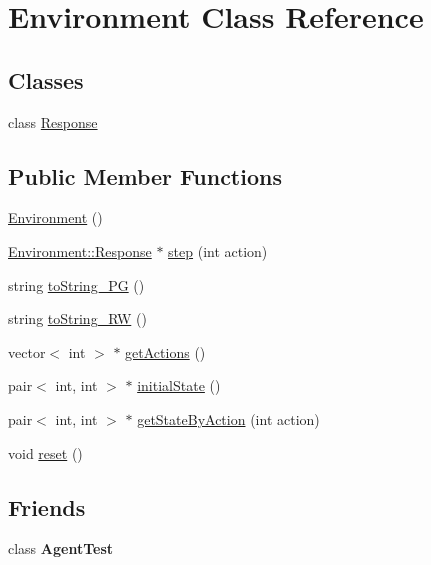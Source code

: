 \hypertarget{class_environment}{}\section{Environment Class Reference}
\label{class_environment}
\subsection*{Classes}
\begin{DoxyCompactItemize}
\item 
class \mbox{\hyperlink{class_environment_1_1_response}{Response}}
\end{DoxyCompactItemize}
\subsection*{Public Member Functions}
\begin{DoxyCompactItemize}
\item 
\mbox{\hyperlink{class_environment_a8b427c4448d8b7536666837521b9e83d}{Environment}} ()
\item 
\mbox{\hyperlink{class_environment_1_1_response}{Environment\+::\+Response}} $\ast$ \mbox{\hyperlink{class_environment_ab2531f3a79f25737da27ae5cac29ad05}{step}} (int action)
\item 
string \mbox{\hyperlink{class_environment_a7df8eab35d7ff6b7ce05eac019073ff1}{to\+String\+\_\+\+PG}} ()
\item 
string \mbox{\hyperlink{class_environment_aa542e4df56a2c6a2039fee9949052f0b}{to\+String\+\_\+\+RW}} ()
\item 
vector$<$ int $>$ $\ast$ \mbox{\hyperlink{class_environment_a98a9bfe041ae2fad721a96ee092fa45b}{get\+Actions}} ()
\item 
pair$<$ int, int $>$ $\ast$ \mbox{\hyperlink{class_environment_a7a7745adf6e9a0aec3b750e26e629f8b}{initial\+State}} ()
\item 
pair$<$ int, int $>$ $\ast$ \mbox{\hyperlink{class_environment_a93f31f5c387e9a470f49957f5a65aa31}{get\+State\+By\+Action}} (int action)
\item 
void \mbox{\hyperlink{class_environment_a9bf96c5e6b817be1595b24992cde8e82}{reset}} ()
\end{DoxyCompactItemize}
\subsection*{Friends}
\begin{DoxyCompactItemize}
\item 
\mbox{\label{class_environment_ada6eaf56009c10f181cfc7b8e9957846}} 
class {\bfseries Agent\+Test}
\end{DoxyCompactItemize}


